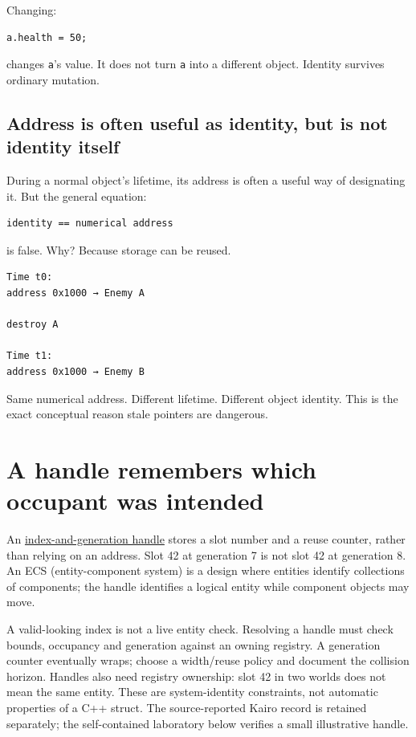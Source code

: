 Changing:

\begin{verbatim}
a.health = 50;
\end{verbatim}

changes \texttt{a}'s value. It does not turn \texttt{a} into a different object. Identity survives ordinary mutation.

\subsection{Address is often useful as identity, but is not identity itself}\label{05-engine-i-ch002-address-is-often-useful-as-identity-but-is-not-identity-itself}

During a normal object's lifetime, its address is often a useful way of designating it. But the general equation:

\begin{verbatim}
identity == numerical address
\end{verbatim}

is false. Why? Because storage can be reused.

\begin{verbatim}
Time t0:
address 0x1000 → Enemy A

destroy A

Time t1:
address 0x1000 → Enemy B
\end{verbatim}

Same numerical address. Different lifetime. Different object identity. This is the exact conceptual reason stale pointers are dangerous.

\section{A handle remembers which occupant was intended}\label{05-engine-i-ch002-a-handle-remembers-which-occupant-was-intended}

An \hyperref[appendix-f1581457d322]{index-and-generation handle} stores a slot number and a reuse counter, rather than relying on an address. Slot 42 at generation 7 is not slot 42 at generation 8. An ECS (entity-component system) is a design where entities identify collections of components; the handle identifies a logical entity while component objects may move.

A valid-looking index is not a live entity check. Resolving a handle must check bounds, occupancy and generation against an owning registry. A generation counter eventually wraps; choose a width/reuse policy and document the collision horizon. Handles also need registry ownership: slot 42 in two worlds does not mean the same entity. These are system-identity constraints, not automatic properties of a C++ struct. The source-reported Kairo record is retained separately; the self-contained laboratory below verifies a small illustrative handle.

